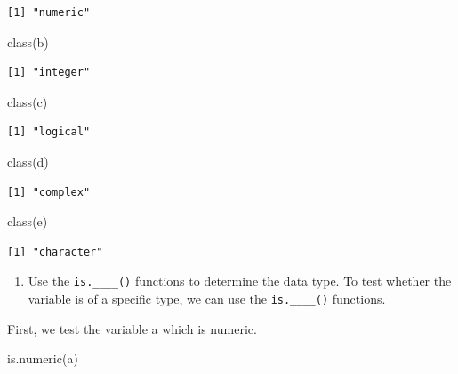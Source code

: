 \documentclass[
  letterpaper,
  DIV=11,
  numbers=noendperiod]{scrreprt}
\newenvironment{Shaded}{\begin{snugshade}}{\end{snugshade}}
\newcommand{\FunctionTok}[1]{\textcolor[rgb]{0.28,0.35,0.67}{#1}}
\newcommand{\NormalTok}[1]{\textcolor[rgb]{0.00,0.23,0.31}{#1}}
\providecommand{\tightlist}{%
  \setlength{\itemsep}{0pt}\setlength{\parskip}{0pt}}\usepackage{longtable,booktabs,array}
\begin{document}
\begin{verbatim}
[1] "numeric"
\end{verbatim}

\begin{Shaded}
\begin{Highlighting}[]
\FunctionTok{class}\NormalTok{(b)}
\end{Highlighting}
\end{Shaded}

\begin{verbatim}
[1] "integer"
\end{verbatim}

\begin{Shaded}
\begin{Highlighting}[]
\FunctionTok{class}\NormalTok{(c)}
\end{Highlighting}
\end{Shaded}

\begin{verbatim}
[1] "logical"
\end{verbatim}

\begin{Shaded}
\begin{Highlighting}[]
\FunctionTok{class}\NormalTok{(d)}
\end{Highlighting}
\end{Shaded}

\begin{verbatim}
[1] "complex"
\end{verbatim}

\begin{Shaded}
\begin{Highlighting}[]
\FunctionTok{class}\NormalTok{(e)}
\end{Highlighting}
\end{Shaded}

\begin{verbatim}
[1] "character"
\end{verbatim}

\begin{enumerate}
\def\labelenumi{\arabic{enumi}.}
\setcounter{enumi}{2}
\tightlist
\item
  Use the \texttt{is.\_\_\_\_()} functions to determine the data type.
  To test whether the variable is of a specific type, we can use the
  \texttt{is.\_\_\_\_()} functions.
\end{enumerate}

First, we test the variable a which is numeric.

\begin{Shaded}
\begin{Highlighting}[]
\FunctionTok{is.numeric}\NormalTok{(a)}
\end{Highlighting}
\end{Shaded}
\end{document}
